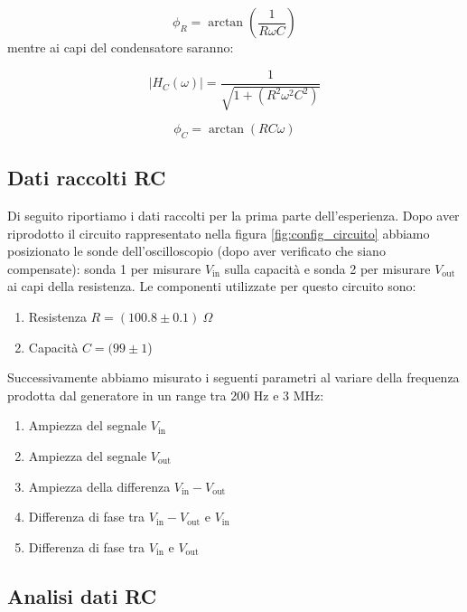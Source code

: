 \documentclass[letterpaper,12pt]{article}
\begin{document}
\begin{equation}
    \label{eq:Fase RC (resistenza)}
    \phi_R = \arctan\left(\frac{1}{R\omega C}\right)
\end{equation}
mentre ai capi del condensatore saranno: 

\begin{equation}
    \label{eq:Modulo RC (condensatore)}
    |H_C(\omega)| = \frac{1}{\sqrt{1 + (R^2\omega^2C^2)}}
\end{equation}

\begin{equation}
    \label{eq:Fase RC (condensatore)}
    \phi_C = \arctan(RC\omega)
\end{equation}

    
\newpage


\subsection{Dati raccolti RC}
Di seguito riportiamo i dati raccolti per la prima parte dell'esperienza. Dopo aver riprodotto il circuito rappresentato nella figura \ref{fig:config_circuito} abbiamo posizionato le sonde dell'oscilloscopio (dopo aver verificato che siano compensate): sonda 1 per misurare $V_\text{in}$ sulla capacità e sonda 2 per misurare $V_\text{out}$ ai capi della resistenza. Le componenti utilizzate per questo circuito sono:

\begin{enumerate}
    \item Resistenza $R = (100.8\pm0.1)\ \Omega$
    \item Capacità $C = (99\pm1$) 
\end{enumerate}
Successivamente abbiamo misurato i seguenti parametri al variare della frequenza prodotta dal generatore in un range tra 200 Hz e 3 MHz:
\begin{enumerate}
    \item Ampiezza del segnale $V_\text{in}$
    \item Ampiezza del segnale $V_\text{out}$
    \item Ampiezza della differenza $V_\text{in} - V_\text{out}$
    \item Differenza di fase tra $V_\text{in} - V_\text{out}$ e $V_\text{in}$
    \item Differenza di fase tra $V_\text{in}$ e $V_\text{out}$
\end{enumerate}



\subsection{Analisi dati RC} \label{subsec:Modulo RC}
\end{document}

